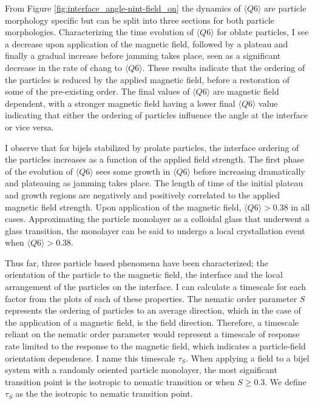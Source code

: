 From Figure \ref{fig:interface_angle-nint-field_on} the dynamics of $\langle Q6 \rangle$ are particle morphology specific but can be split into three sections for 
both particle morphologies. Characterizing the time evolution of $\langle Q6 \rangle$ for oblate particles, I see a decrease upon application of the magnetic field, 
followed by a plateau and finally a gradual increase before jamming takes place, seen as a significant decrease in the rate of chang to $\langle Q6 \rangle$.
These results indicate that the ordering of the particles is reduced by the applied magnetic field, before a
restoration of some of the pre-existing order. The final values of $\langle Q6 \rangle$ are magnetic field dependent, with a stronger
magnetic field having a lower final $\langle Q6 \rangle$ value indicating that either the ordering of particles influence the angle at
the interface or vice versa. 

I observe that for bijels stabilized by prolate particles, the interface ordering of the particles increases as a
function of the applied field strength. The first phase of the evolution of $\langle Q6 \rangle$ sees some growth in $\langle Q6 \rangle$ before 
increasing dramatically and plateauing as jamming takes place. The length of time of the initial plateau and growth regions are negatively and
positively correlated to the applied magnetic field strength. Upon application of the magnetic field, $\langle Q6 \rangle > 0.38$ in all cases. Approximating
the particle monolayer as a colloidal glass that underwent a glass transition, the monolayer can be said to undergo a local crystallation event when 
$\langle Q6 \rangle > 0.38$. \cite{toxvaerd_role_2020}

Thus far, three particle based phenomena have been characterized; the orientation of the particle to the magnetic field, the interface and the local 
arrangement of the particles on the interface. I can calculate a timescale for each factor from the plots of each of these properties.
The nematic order parameter $S$ represents the ordering of
particles to an average direction, which in the case of the application
of a magnetic field, is the field direction. Therefore, a timescale
reliant on the nematic order parameter would represent a timescale of
response rate limited to the response to the magnetic field, which
indicates a particle-field orientation dependence. I name this
timescale $\tau_S$. When applying a field to a bijel system with a
randomly oriented particle monolayer, the most significant transition
point is the isotropic to nematic transition or when $S \geq 0.3$. We
define $\tau_S$ as the the isotropic to nematic transition point.

